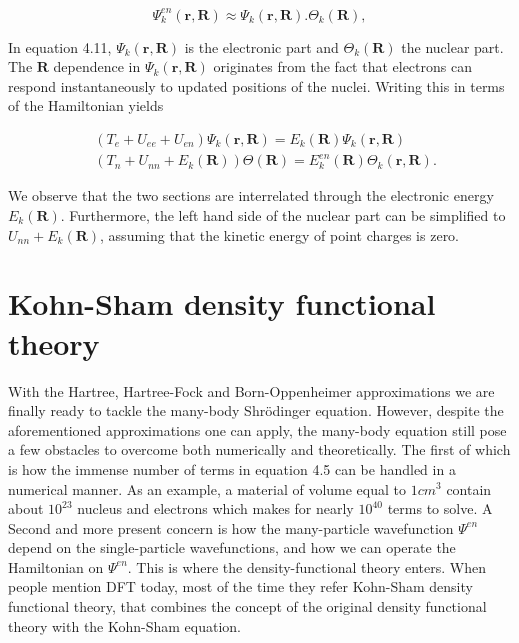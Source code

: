 \begin{equation}
    \Psi_{k}^{en}(\boldsymbol{r}, \boldsymbol{R}) \approx \Psi_k(\boldsymbol{r}, \boldsymbol{R}). \Theta_k(\boldsymbol{R}),
\end{equation}

In equation 4.11, $\Psi_k(\boldsymbol{r}, \boldsymbol{R})$ is the electronic part and $\Theta_k(\boldsymbol{R})$ the nuclear part. The $\boldsymbol{R}$ dependence in $\Psi_k(\boldsymbol{r}, \boldsymbol{R})$ originates from the fact that electrons can respond instantaneously to updated positions of the nuclei. Writing this in terms of the Hamiltonian yields

\begin{align}
    &\left( T_{e} + U_{ee} + U_{en} \right) \Psi_k(\boldsymbol{r}, \boldsymbol{R}) = E_k(\boldsymbol{R})\Psi_k(\boldsymbol{r}, \boldsymbol{R}) \\
    &\left( T_{n} + U_{nn} + E_k(\boldsymbol{R}) \right) \Theta(\boldsymbol{R}) = E_{k}^{en}(\boldsymbol{R})\Theta_k(\boldsymbol{r}, \boldsymbol{R}).
\end{align}

We observe that the two sections are interrelated through the electronic energy $E_k(\boldsymbol{R})$. Furthermore, the left hand side of the nuclear part can be simplified to $U_{nn} + E_k(\boldsymbol{R})$, assuming that the kinetic energy of point charges is zero.

\section{Kohn-Sham density functional theory}

With the Hartree, Hartree-Fock and Born-Oppenheimer approximations we are finally ready to tackle the many-body Shr\"{o}dinger equation. However, despite the aforementioned approximations one can apply, the many-body equation still pose a few obstacles to overcome both numerically and theoretically. The first of which is how the immense number of terms in equation 4.5 can be handled in a numerical manner. As an example, a material of volume equal to $1cm^3$ contain about $10^{23}$ nucleus and electrons which makes for nearly $10^{40}$ terms to solve. A Second and more present concern is how the many-particle wavefunction $\Psi^{en}$ depend on the single-particle wavefunctions, and how we can operate the Hamiltonian on $\Psi^{en}$. This is where the density-functional theory enters. When people mention DFT today, most of the time they refer Kohn-Sham density functional theory, that combines the concept of the original density functional theory with the Kohn-Sham equation.


